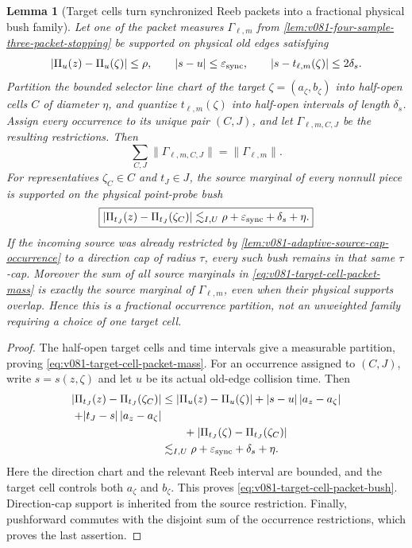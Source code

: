 \documentclass[10pt]{article}
\newtheorem{lemma}[theorem]{Lemma}
\begin{document}
\begin{lemma}[Target cells turn synchronized Reeb packets into a fractional physical bush family]
\label{lem:v081-target-cell-three-packet-bushes}
Let one of the packet measures \(\Gamma_{\ell,m}\) from
\cref{lem:v081-four-sample-three-packet-stopping} be supported on physical old edges satisfying
\[
|\Pi_u(z)-\Pi_u(\zeta)|\le \rho,
\qquad
|s-u|\le\varepsilon_{\rm sync},
\qquad
|s-t_{\ell,m}(\zeta)|\le2\delta_s.
\]
Partition the bounded selector line chart of the target \(\zeta=(a_\zeta,b_\zeta)\) into half-open
cells \(C\) of diameter \(\eta\), and quantize \(t_{\ell,m}(\zeta)\) into half-open intervals of
length \(\delta_s\).  Assign every occurrence to its unique pair \((C,J)\), and let
\(\Gamma_{\ell,m,C,J}\) be the resulting restrictions.  Then
\begin{equation}
\label{eq:v081-target-cell-packet-mass}
\boxed{
\sum_{C,J}\|\Gamma_{\ell,m,C,J}\|
=
\|\Gamma_{\ell,m}\|.
}
\end{equation}
For representatives \(\zeta_C\in C\) and \(t_J\in J\), the source marginal of every nonnull piece
is supported on the physical point-probe bush
\begin{equation}
\label{eq:v081-target-cell-packet-bush}
\boxed{
\left|
\Pi_{t_J}(z)-\Pi_{t_J}(\zeta_C)
\right|
\lesssim_{I,U}
\rho+\varepsilon_{\rm sync}+\delta_s+\eta.
}
\end{equation}
If the incoming source was already restricted by
\cref{lem:v081-adaptive-source-cap-occurrence} to a direction cap of radius \(\tau\), every such
bush remains in that same \(\tau\)-cap.  Moreover the sum of all source marginals in
\eqref{eq:v081-target-cell-packet-mass} is exactly the source marginal of
\(\Gamma_{\ell,m}\), even when their physical supports overlap.  Hence this is a fractional
occurrence partition, not an unweighted family requiring a choice of one target cell.
\end{lemma}

\begin{proof}
The half-open target cells and time intervals give a measurable partition, proving
\eqref{eq:v081-target-cell-packet-mass}.  For an occurrence assigned to \((C,J)\), write
\(s=s(z,\zeta)\) and let \(u\) be its actual old-edge collision time.  Then
\[
\begin{aligned}
|\Pi_{t_J}(z)-\Pi_{t_J}(\zeta_C)|
&\le
|\Pi_u(z)-\Pi_u(\zeta)|
+|s-u|\,|a_z-a_\zeta|\\
+|t_J-s|\,|a_z-a_\zeta|\\
&\qquad
+|\Pi_{t_J}(\zeta)-\Pi_{t_J}(\zeta_C)|\\
&\lesssim_{I,U}
\rho+\varepsilon_{\rm sync}+\delta_s+\eta.
\end{aligned}
\]
Here the direction chart and the relevant Reeb interval are bounded, and the target cell controls
both \(a_\zeta\) and \(b_\zeta\).  This proves
\eqref{eq:v081-target-cell-packet-bush}.  Direction-cap support is inherited from the source
restriction.  Finally, pushforward commutes with the disjoint sum of the occurrence restrictions,
which proves the last assertion.
\end{proof}
\end{document}

